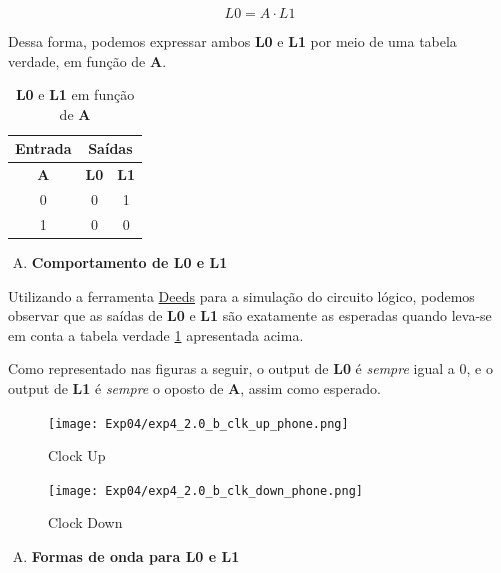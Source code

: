\documentclass[12pt]{article}
\begin{document}
\begin{equation}
L0 = A \cdot L1\label{eq:L0}
\end{equation}

Dessa forma, podemos expressar ambos \textbf{L0} e \textbf{L1} por meio de uma
tabela verdade, em função de \textbf{A}.

\begin{table}[H]
    \centering
    \caption{\textbf{L0} e \textbf{L1} em função de \textbf{A}}
    \begin{tabular}{|c|c|c|}\hline
        \multicolumn{1}{|c|}{Entrada} & \multicolumn{2}{|c|}{Saídas} \\\hline
        \textbf{A} & \textbf{L0} & \textbf{L1} \\\hline
        0 & 0 & 1 \\\hline
        1 & 0 & 0 \\\hline
    \end{tabular}\label{tab:atraso_de_propagação:L0_L1}
\end{table}

\begin{enumerate}[B)]
\item \textbf{Comportamento de L0 e L1}
\end{enumerate}

Utilizando a ferramenta
\href{https://www.digitalelectronicsdeeds.com/deeds.html}{Deeds} para a
simulação do circuito lógico, podemos observar que as saídas de \textbf{L0} e
\textbf{L1} são exatamente as esperadas quando leva-se em conta a tabela verdade
\ref{tab:atraso_de_propagação:L0_L1} apresentada acima.

Como representado nas figuras a seguir, o output de \textbf{L0} é \emph{sempre}
igual a $0$, e o output de \textbf{L1} é \emph{sempre} o oposto de \textbf{A},
assim como esperado.

\begin{figure}[H]
    \centering
    \texttt{[image: Exp04/exp4\_2.0\_b\_clk\_up\_phone.png]}
    \caption{Clock Up}\label{fig:exp4_2.0_b_clk_up_phone.png}
\end{figure}

\begin{figure}[H]
    \centering
    \texttt{[image: Exp04/exp4\_2.0\_b\_clk\_down\_phone.png]}
    \caption{Clock Down}\label{fig:exp4_2.0_b_clk_down_phone.png}
\end{figure}

\begin{enumerate}[C)]
\item \textbf{Formas de onda para L0 e L1}
\end{enumerate}
\end{document}
